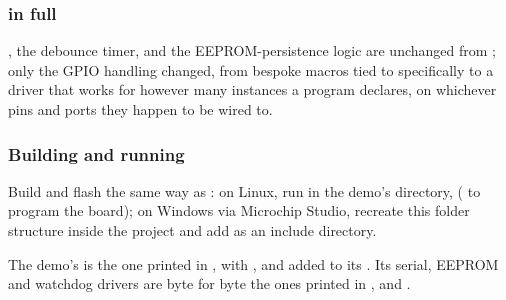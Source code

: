 \subsubsection{ in full}

\noindent{}, the debounce timer, and the EEPROM-persistence logic are unchanged from
; only the GPIO handling changed, from bespoke macros tied to 
specifically to a driver that works for however many  instances a program declares,
on whichever pins and ports they happen to be wired to.

\subsubsection{Building and running}
Build and flash the same way as : on Linux, run  in the demo's
directory,  ( to program the board); on
Windows via Microchip Studio, recreate this folder structure inside the project and add
 as an include directory.

The demo's  is the one printed in , with
,  and 
added to its . Its serial, EEPROM and watchdog drivers are byte for byte the ones
printed in ,  and .
